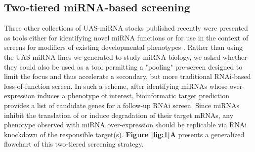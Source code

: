 \subsection*{Two-tiered miRNA-based screening}

Three other collections of UAS-miRNA stocks published recently were presented as tools either for identifying novel miRNA functions \cite{aleigh_Kim_Ni_Duan_et_al__2012,shauser_Forstemann_Basler_2012} or for use in the context of screens for modifiers of existing developmental phenotypes \cite{gler_Lim_Verma_Chen_Cohen_2012}.
Rather than using the UAS-miRNA lines we generated\cite{Suh_2015} to study miRNA biology, we asked whether they could also be used as a tool permitting a "pooling" pre-screen designed to limit the focus and thus accelerate a secondary, but more traditional RNAi-based loss-of-function screen.
In such a scheme, after identifying miRNAs whose over-expression induces a phenotype of interest, bioinformatic target prediction provides a list of candidate genes for a follow-up RNAi screen.
Since miRNAs inhibit the translation of or induce degradation of their target mRNAs, any phenotype observed with miRNA over-expression should be replicable via RNAi knockdown of the responsible target(s).
\textbf{Figure \ref{fig:1}A} presents a generalized flowchart of this two-tiered screening strategy.